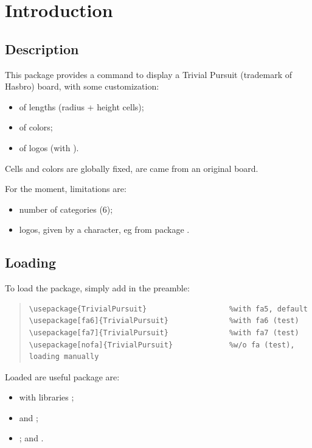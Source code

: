 \documentclass[11pt,a4paper]{ltxdoc}
\begin{document}
\section{Introduction}

\subsection{Description}

This package provides a command to display a \textsf{Trivial Pursuit} (trademark of Hasbro) board, with some customization:

\begin{itemize}
	\item of lengths (radius + height cells);
	\item of colors;
	\item of logos (with ).
\end{itemize}

Cells and colors are globally fixed, are came from an original board.

\medskip

For the moment, limitations are:

\begin{itemize}
	\item number of categories (6);
	\item logos, given by a character, eg from package .
\end{itemize}

\subsection{Loading}

To load the package, simply add in the preamble:

\begin{quote}
\begin{verbatim}
\usepackage{TrivialPursuit}                   %with fa5, default
\usepackage[fa6]{TrivialPursuit}              %with fa6 (test)
\usepackage[fa7]{TrivialPursuit}              %with fa7 (test)
\usepackage[nofa]{TrivialPursuit}             %w/o fa (test), loading manually
\end{verbatim}
\end{quote}

Loaded are useful package are:

\begin{itemize}
	\item {} with libraries ;
	\item {} and ;
	\item {};  and .
\end{itemize}
\end{document}
